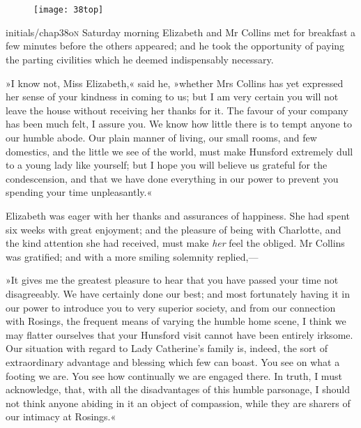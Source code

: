 \chapter[Chapter \thechapter]{}
	
\begin{figure}[t!]
\centering
\texttt{[image: 38top]}
\end{figure}


\lettrine[lines=6,image=true]{initials/chap38o}{n} Saturday morning Elizabeth and Mr Collins met for breakfast a few minutes before the others appeared; and he took the opportunity of paying the parting civilities which he deemed indispensably necessary.

\zz
»I know not, Miss Elizabeth,« said he, »whether Mrs Collins has yet expressed her sense of your kindness in coming to us; but I am very certain you will not leave the house without receiving her thanks for it. The favour of your company has been much felt, I assure you. We know how little there is to tempt anyone to our humble abode. Our plain manner of living, our small rooms, and few domestics, and the little we see of the world, must make Hunsford extremely dull to a young lady like yourself; but I hope you will believe us grateful for the condescension, and that we have done everything in our power to prevent you spending your time unpleasantly.«

Elizabeth was eager with her thanks and assurances of happiness. She had spent six weeks with great enjoyment; and the pleasure of being with Charlotte, and the kind attention she had received, must make \textit{her} feel the obliged. Mr Collins was gratified; and with a more smiling solemnity replied,—

»It gives me the greatest pleasure to hear that you have passed your time not disagreeably. We have certainly done our best; and most fortunately having it in our power to introduce you to very superior society, and from our connection with Rosings, the frequent means of varying the humble home scene, I think we may flatter ourselves that your Hunsford visit cannot have been entirely irksome. Our situation with regard to Lady Catherine's family is, indeed, the sort of extraordinary advantage and blessing which few can boast. You see on what a footing we are. You see how continually we are engaged there. In truth, I must acknowledge, that, with all the disadvantages of this humble parsonage, I should not think anyone abiding in it an object of compassion, while they are sharers of our intimacy at Rosings.«


